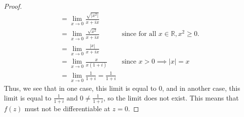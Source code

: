 \documentclass[10pt,a4paper]{article}
\begin{document}
\begin{proof}{$ $}
\begin{align*}
&= \lim_{x \to 0}\frac{\sqrt{|x^2|}}{x + ix}\\
&= \lim_{x \to 0}\frac{\sqrt{x^2}}{x + ix} &\text{since for all } x \in \mathbb{R}, x^2 \geq 0.\\
&= \lim_{x \to 0}\frac{|x|}{x + ix}\\
&= \lim_{x \to 0}\frac{x}{x(1 + i)} &\text{since } x > 0 \implies |x| = x\\
&= \lim_{x \to 0}\frac{1}{1 + i} = \frac{1}{1+i}
\end{align*}
Thus, we see that in one case, this limit is equal to $0$, and in another case, this limit is equal to $\displaystyle \frac{1}{1+i} \text{ and } 0 \neq \frac{1}{1 + i}$, so the limit does not exist. This means that $f(z)$ must not be differentiable at $z = 0$. 
\end{proof}
\end{document}
